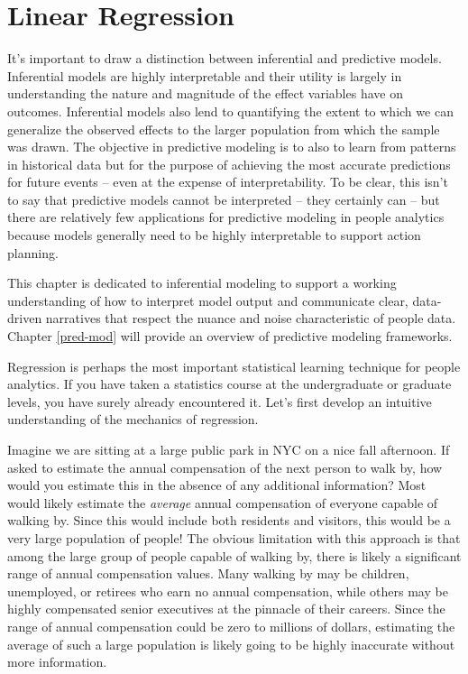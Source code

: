 \documentclass[
]{book}
\begin{document}
\hypertarget{lm}{%
\chapter{Linear Regression}\label{lm}}

It's important to draw a distinction between inferential and predictive models. Inferential models are highly interpretable and their utility is largely in understanding the nature and magnitude of the effect variables have on outcomes. Inferential models also lend to quantifying the extent to which we can generalize the observed effects to the larger population from which the sample was drawn. The objective in predictive modeling is to also to learn from patterns in historical data but for the purpose of achieving the most accurate predictions for future events -- even at the expense of interpretability. To be clear, this isn't to say that predictive models cannot be interpreted -- they certainly can -- but there are relatively few applications for predictive modeling in people analytics because models generally need to be highly interpretable to support action planning.

This chapter is dedicated to inferential modeling to support a working understanding of how to interpret model output and communicate clear, data-driven narratives that respect the nuance and noise characteristic of people data. Chapter \ref{pred-mod} will provide an overview of predictive modeling frameworks.

Regression is perhaps the most important statistical learning technique for people analytics. If you have taken a statistics course at the undergraduate or graduate levels, you have surely already encountered it. Let's first develop an intuitive understanding of the mechanics of regression.

Imagine we are sitting at a large public park in NYC on a nice fall afternoon. If asked to estimate the annual compensation of the next person to walk by, how would you estimate this in the absence of any additional information? Most would likely estimate the \emph{average} annual compensation of everyone capable of walking by. Since this would include both residents and visitors, this would be a very large population of people! The obvious limitation with this approach is that among the large group of people capable of walking by, there is likely a significant range of annual compensation values. Many walking by may be children, unemployed, or retirees who earn no annual compensation, while others may be highly compensated senior executives at the pinnacle of their careers. Since the range of annual compensation could be zero to millions of dollars, estimating the average of such a large population is likely going to be highly inaccurate without more information.
\end{document}
